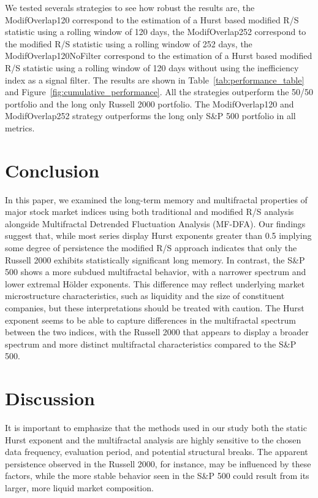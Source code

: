 \documentclass[11pt]{extarticle}
\begin{document}
We tested severals strategies to see how robust the results are, the ModifOverlap120 correspond to the estimation of a
Hurst based modified R/S statistic using a rolling window of 120 days, the ModifOverlap252 correspond to the
modified R/S statistic using a rolling window of 252 days, the ModifOverlap120NoFilter correspond to the estimation of a
Hurst based modified R/S statistic using a rolling window of 120 days without using the inefficiency index as a signal filter.
The results are shown in Table~\ref{tab:performance_table} and Figure~\ref{fig:cumulative_performance}.
All the strategies outperform the 50/50 portfolio and the long only Russell 2000 portfolio.
The ModifOverlap120 and ModifOverlap252 strategy outperforms the long only S\&P 500 portfolio in all metrics.


\section{Conclusion}

In this paper, we examined the long-term memory and multifractal properties of major stock market indices using both
traditional and modified R/S analysis alongside Multifractal Detrended Fluctuation Analysis (MF-DFA). Our findings
suggest that, while most series display Hurst exponents greater than 0.5 implying some degree of persistence the
modified R/S approach indicates that only the Russell 2000 exhibits statistically significant long memory.
In contrast, the S\&P 500 shows a more subdued multifractal behavior, with a narrower spectrum and lower extremal Hölder
exponents. This difference may reflect underlying market microstructure characteristics, such as liquidity and the size
of constituent companies, but these interpretations should be treated with caution. The Hurst exponent seems to be able
to capture differences in the multifractal spectrum between the two indices, with the Russell 2000 that appears to
display a broader spectrum and more distinct multifractal characteristics compared to the S\&P 500.

\section{Discussion}

It is important to emphasize that the methods used in our study both the static Hurst exponent and the multifractal
analysis are highly sensitive to the chosen data frequency, evaluation period, and potential structural breaks. The
apparent persistence observed in the Russell 2000, for instance, may be influenced by these factors, while the more
stable behavior seen in the S\&P 500 could result from its larger, more liquid market composition.
\end{document}

